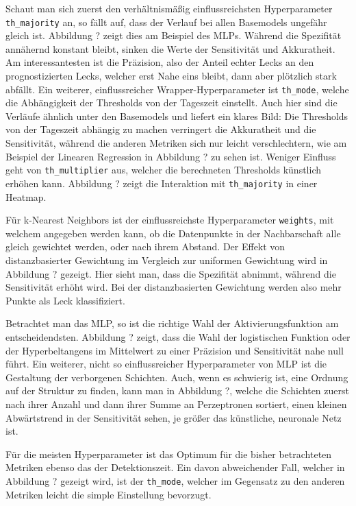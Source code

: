 Schaut man sich zuerst den verhältnismäßig einflussreichsten Hyperparameter \texttt{th\_majority} an, so fällt auf,
 dass der Verlauf bei allen Basemodels ungefähr gleich ist. Abbildung ? zeigt dies am Beispiel des MLPs. Während
 die Spezifität annähernd konstant bleibt, sinken die Werte der Sensitivität und Akkuratheit. Am interessantesten
 ist die Präzision, also der Anteil echter Lecks an den prognostizierten Lecks, welcher erst Nahe eins bleibt,
 dann aber plötzlich stark abfällt. Ein weiterer, einflussreicher Wrapper-Hyperparameter ist \texttt{th\_mode},
 welche die Abhängigkeit der Thresholds von der Tageszeit einstellt. Auch hier sind die Verläufe ähnlich unter
 den Basemodels und liefert ein klares Bild: Die Thresholds von der Tageszeit abhängig zu machen verringert die
 Akkuratheit und die Sensitivität, während die anderen Metriken sich nur leicht verschlechtern, wie am Beispiel
 der Linearen Regression in Abbildung ? zu sehen ist. Weniger Einfluss geht von \texttt{th\_multiplier} aus,
 welcher die berechneten Thresholds künstlich erhöhen kann. Abbildung ? zeigt die Interaktion mit
 \texttt{th\_majority} in einer Heatmap.

Für k-Nearest Neighbors ist der einflussreichste Hyperparameter \texttt{weights}, mit welchem angegeben werden
 kann, ob die Datenpunkte in der Nachbarschaft alle gleich gewichtet werden, oder nach ihrem Abstand. Der Effekt
 von distanzbasierter Gewichtung im Vergleich zur uniformen Gewichtung wird in Abbildung ? gezeigt. Hier sieht
 man, dass die Spezifität abnimmt, während die Sensitivität erhöht wird. Bei der distanzbasierten Gewichtung
 werden also mehr Punkte als Leck klassifiziert.

Betrachtet man das MLP, so ist die richtige Wahl der Aktivierungsfunktion am entscheidendsten. Abbildung ?
 zeigt, dass die Wahl der logistischen Funktion oder der Hyperbeltangens im Mittelwert zu einer Präzision
 und Sensitivität nahe null führt. Ein weiterer, nicht so einflussreicher Hyperparameter von MLP ist die
 Gestaltung der verborgenen Schichten. Auch, wenn es schwierig ist, eine Ordnung auf der Struktur zu finden,
 kann man in Abbildung ?, welche die Schichten zuerst nach ihrer Anzahl und dann ihrer Summe an Perzeptronen
 sortiert, einen kleinen Abwärtstrend in der Sensitivität sehen, je größer das künstliche, neuronale Netz ist.

 Für die meisten Hyperparameter ist das Optimum für die bisher betrachteten Metriken ebenso das der
  Detektionszeit. Ein davon abweichender Fall, welcher in Abbildung ? gezeigt wird, ist der \texttt{th\_mode},
  welcher im Gegensatz zu den anderen Metriken leicht die simple Einstellung bevorzugt.

